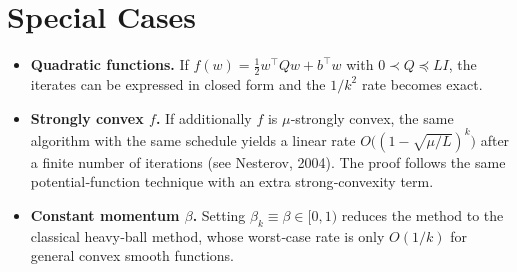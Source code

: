 \documentclass{article}
\begin{document}
\section*{Special Cases}
\begin{itemize}
\item \textbf{Quadratic functions.} If $f(w)=\tfrac12 w^\top Q w+b^\top w$ with $0\prec Q\preceq L I$, the iterates can be expressed in closed form and the $1/k^2$ rate becomes exact.
\item \textbf{Strongly convex $f$.} If additionally $f$ is $\mu$‑strongly convex, the same algorithm with the same schedule yields a linear rate $O\bigl((1-\sqrt{\mu/L})^k\bigr)$ after a finite number of iterations (see Nesterov, 2004). The proof follows the same potential‑function technique with an extra strong‑convexity term.
\item \textbf{Constant momentum $\beta$.} Setting $\beta_k\equiv\beta\in[0,1)$ reduces the method to the classical heavy‑ball method, whose worst‑case rate is only $O(1/k)$ for general convex smooth functions.
\end{itemize}
\end{document}
